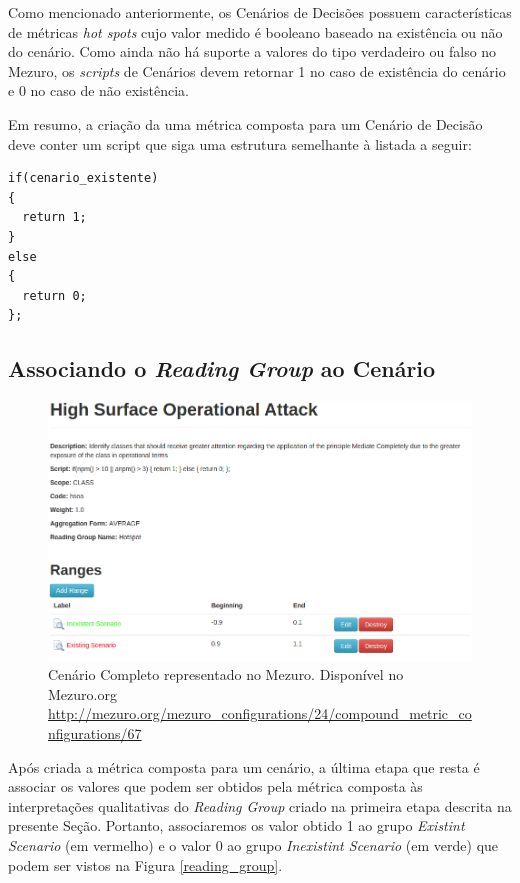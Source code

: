 Como mencionado anteriormente, os Cenários de Decisões possuem características de métricas \emph{hot spots} cujo valor medido é booleano baseado na existência ou não do cenário. Como ainda não há suporte a valores do tipo verdadeiro ou falso no Mezuro, os \emph{scripts} de Cenários devem retornar 1 no caso de existência do cenário e 0 no caso de não existência.

Em resumo, a criação da uma métrica composta para um Cenário de Decisão deve conter um script que siga uma estrutura semelhante à listada a seguir:

\begin{lstlisting}[caption={Estrutura de script básica para Cenários de Decisões}, label=script_example]
if(cenario_existente)
{
  return 1;
}
else
{
  return 0;
};
\end{lstlisting}

\subsection{Associando o \emph{Reading Group} ao Cenário}

\graphicspath{{figuras/}}
\begin{figure}[h]
\centering
\includegraphics[width=1.0\textwidth]{cenario_completo}
\caption{Cenário Completo representado no Mezuro. Disponível no Mezuro.org \url{http://mezuro.org/mezuro_configurations/24/compound_metric_configurations/67}}
\label{cenario_completo}
\end{figure}

Após criada a métrica composta para um cenário, a última etapa que resta é associar os valores que podem ser obtidos pela métrica composta às interpretações qualitativas do \emph{Reading Group} criado na primeira etapa descrita na presente Seção. Portanto, associaremos os valor obtido 1 ao grupo \emph{Existint Scenario} (em vermelho) e o valor 0 ao grupo \emph{Inexistint Scenario} (em verde) que podem ser vistos na Figura \ref{reading_group}.

